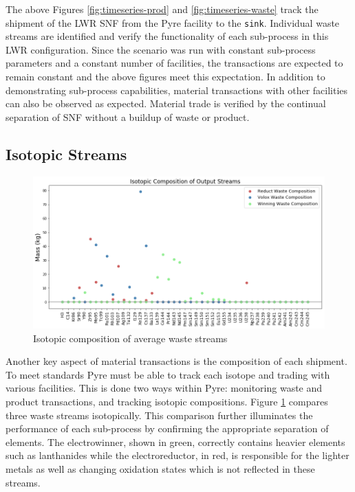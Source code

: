 The above Figures \ref{fig:timeseries-prod} and \ref{fig:timeseries-waste} track the shipment of the LWR SNF from the Pyre facility to the \texttt{sink}.
Individual waste streams are identified and verify the functionality of each sub-process in this LWR configuration. Since the scenario was run with
constant sub-process parameters and a constant number of facilities, the transactions are expected to remain constant and the above figures meet this expectation.
In addition to demonstrating sub-process capabilities, material transactions with other \Cyclus facilities can also be observed as expected. Material trade is verified by the continual separation of SNF without a buildup of waste or product.

\subsection{Isotopic Streams}
\begin{figure} [h]
	\includegraphics[width=\linewidth]{images/avg-isotope-comp}
	\caption{Isotopic composition of average waste streams}
	\label{fig:avg-isotope-comp}
\end{figure}

Another key aspect of material transactions is the composition of each shipment. To meet \Cyclus standards Pyre must be able to track each isotope and trading with various facilities. This is done two ways within Pyre: monitoring waste and product transactions, and tracking isotopic compositions.
Figure \ref{fig:avg-isotope-comp} compares three waste streams isotopically. This comparison further illuminates the performance of each sub-process by confirming the appropriate separation of elements.
The electrowinner, shown in green, correctly contains heavier elements such as lanthanides while the electroreductor, in red, is responsible for the lighter metals
as well as changing oxidation states which is not reflected in these streams.

